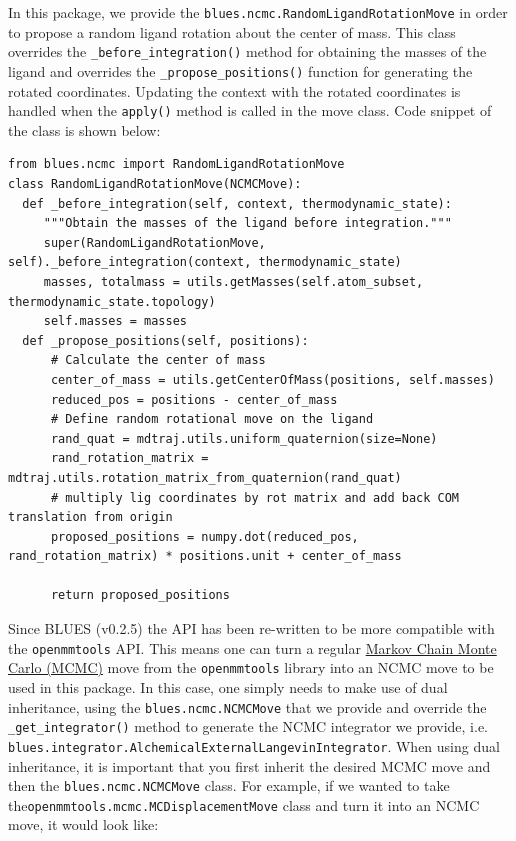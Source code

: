 In this package, we provide the \texttt{blues.ncmc.RandomLigandRotationMove} in order to propose a random ligand rotation about the center of mass.
This class overrides the \texttt{_before_integration()} method for obtaining the masses of the ligand and overrides the \texttt{_propose_positions()} function for generating the rotated coordinates. Updating the context with the rotated coordinates is handled when the \texttt{apply()} method is called in the move class. 
Code snippet of the class is shown below:

\begin{verbatim}
from blues.ncmc import RandomLigandRotationMove
class RandomLigandRotationMove(NCMCMove):
  def _before_integration(self, context, thermodynamic_state):
     """Obtain the masses of the ligand before integration."""
     super(RandomLigandRotationMove, self)._before_integration(context, thermodynamic_state)
     masses, totalmass = utils.getMasses(self.atom_subset, thermodynamic_state.topology)
     self.masses = masses
  def _propose_positions(self, positions):
      # Calculate the center of mass
      center_of_mass = utils.getCenterOfMass(positions, self.masses)
      reduced_pos = positions - center_of_mass
      # Define random rotational move on the ligand
      rand_quat = mdtraj.utils.uniform_quaternion(size=None)
      rand_rotation_matrix = mdtraj.utils.rotation_matrix_from_quaternion(rand_quat)
      # multiply lig coordinates by rot matrix and add back COM translation from origin
      proposed_positions = numpy.dot(reduced_pos, rand_rotation_matrix) * positions.unit + center_of_mass

      return proposed_positions
\end{verbatim}

Since BLUES (v0.2.5) the API has been re-written to be more compatible with the \texttt{openmmtools} API.
This means one can turn a regular \href{https://openmmtools.readthedocs.io/en/0.18.1/mcmc.html\#mcmc-move-types}{Markov Chain Monte Carlo (MCMC)} move from the \texttt{openmmtools} library into an NCMC move to be used in this package. In this case, one simply needs to make use of dual inheritance, using the \texttt{blues.ncmc.NCMCMove} that we provide and override the \texttt{_get_integrator()} method to generate the NCMC integrator we
provide, i.e. \texttt{blues.integrator.AlchemicalExternalLangevinIntegrator}.
When using dual inheritance, it is important that you first inherit the desired MCMC move and then the \texttt{blues.ncmc.NCMCMove} class.
For example, if we wanted to take the\texttt{openmmtools.mcmc.MCDisplacementMove} class and turn it into an NCMC move, it would look like:

